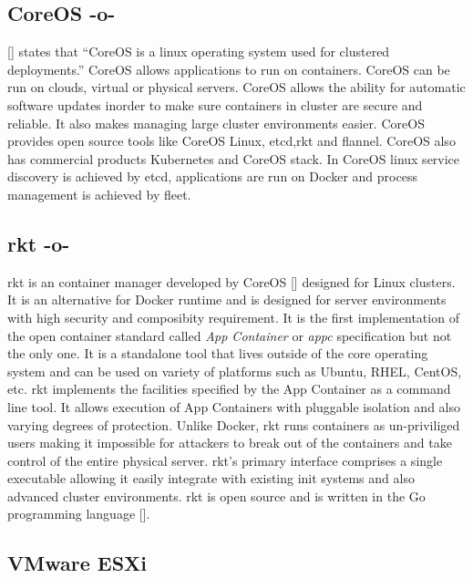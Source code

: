 \subsection{CoreOS -o-}
 [\cite{www-core}] states that ``CoreOS is a linux operating system used
for clustered deployments.'' CoreOS allows applications to run on
containers. CoreOS can be run on clouds, virtual or physical
servers. CoreOS allows the ability for automatic software updates
inorder to make sure containers in cluster are secure and reliable. It
also makes managing large cluster environments easier. CoreOS provides
open source tools like CoreOS Linux, etcd,rkt and flannel. CoreOS also
has commercial products Kubernetes and CoreOS stack. In CoreOS linux
service discovery is achieved by etcd, applications are run on Docker
and process management is achieved by fleet.

\subsection{rkt -o-}

rkt is an container manager developed by CoreOS [\cite{www-CoreOS}]
designed for Linux clusters. It is an alternative for Docker runtime
and is designed for server environments with high security and
composibity requirement. It is the first implementation of the open
container standard called \textit{App Container} or \textit{appc}
specification but not the only one.  It is a standalone tool that
lives outside of the core operating system and can be used on variety
of platforms such as Ubuntu, RHEL, CentOS, etc. rkt implements the
facilities specified by the App Container as a command line tool. It
allows execution of App Containers with pluggable isolation and also
varying degrees of protection. Unlike Docker, rkt runs containers as
un-priviliged users making it impossible for attackers to break out of
the containers and take control of the entire physical server. rkt's
primary interface comprises a single executable allowing it easily
integrate with existing init systems and also advanced cluster
environments. rkt is open source and is written in the Go programming
language [\cite{www-github/rkt}].

     
\subsection{VMware ESXi}

